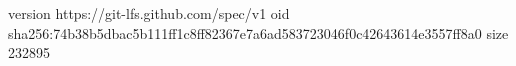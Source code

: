 version https://git-lfs.github.com/spec/v1
oid sha256:74b38b5dbac5b111ff1c8ff82367e7a6ad583723046f0c42643614e3557ff8a0
size 232895
